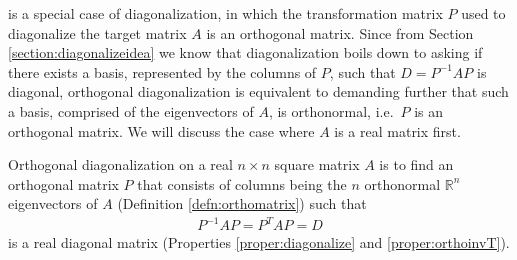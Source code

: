  is a special case of diagonalization, in which the transformation matrix $P$ used to diagonalize the target matrix $A$ is an orthogonal matrix. Since from Section \ref{section:diagonalizeidea} we know that diagonalization boils down to asking if there exists a basis, represented by the columns of $P$, such that $D = P^{-1}AP$ is diagonal, orthogonal diagonalization is equivalent to demanding further that such a basis, comprised of the eigenvectors of $A$, is orthonormal, i.e.\ $P$ is an orthogonal matrix. We will discuss the case where $A$ is a real matrix first.
\begin{defn}
\label{defn:orthodiagonal}
Orthogonal diagonalization on a real $n \times n$ square matrix $A$ is to find an orthogonal matrix $P$ that consists of columns being the $n$ orthonormal $\mathbb{R}^n$ eigenvectors of $A$ (Definition \ref{defn:orthomatrix}) such that
\begin{align}
P^{-1}AP = P^TAP = D \label{eqn:orthodiagonalPAP} 
\end{align}
is a real diagonal matrix (Properties \ref{proper:diagonalize} and \ref{proper:orthoinvT}).
\end{defn}
